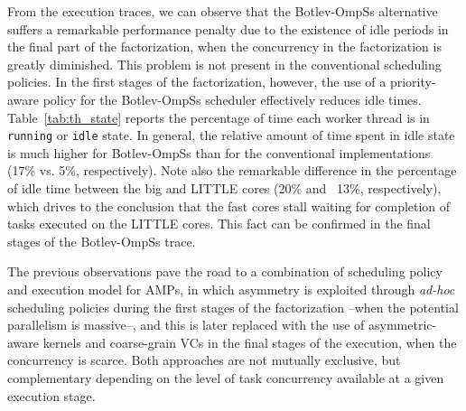 From the execution traces, we can observe that the Botlev-OmpSs alternative suffers a remarkable
performance penalty due to the existence of idle periods in the final part of the factorization, 
when the concurrency in the factorization is greatly diminished. 
This problem is not present in the conventional scheduling policies.
In the first stages of the factorization, however, the use of a priority-aware policy for the Botlev-OmpSs scheduler
effectively reduces idle times. 
Table~\ref{tab:th_state} reports the percentage of time each worker
thread is in {\tt running} or {\tt idle} state. In general, the relative amount of time spent in idle state is much 
higher for Botlev-OmpSs than for the conventional implementations (17\% vs. 5\%, respectively). 
Note also the remarkable difference in the percentage of idle time between 
the big and LITTLE cores (20\% and ~13\%, respectively), which drives to the conclusion that the fast cores stall waiting for
completion of tasks executed on the LITTLE cores. This fact can be confirmed in the final stages of the Botlev-OmpSs trace.

The previous observations pave the road to a combination of scheduling policy and execution model for AMPs, 
in which asymmetry is exploited through {\em ad-hoc} scheduling policies during the first stages of the factorization 
--when the potential parallelism is massive--, and this is later replaced with the use 
of asymmetric-aware kernels and coarse-grain VCs
in the final stages of the execution, when the concurrency is scarce. Both approaches are not mutually exclusive, 
but complementary depending on the level of task concurrency available at a given execution stage.

